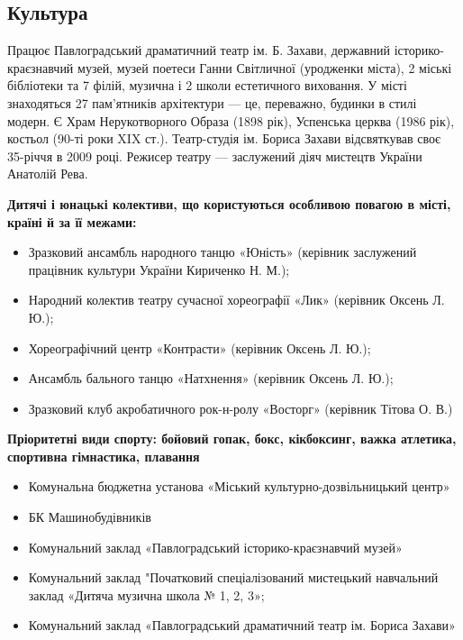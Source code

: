 \subsection{Культура}

 Працює Павлоградський драматичний театр ім. Б. Захави, державний історико-краєзнавчий музей, музей поетеси Ганни Світличної (уродженки міста), 2 міські бібліотеки та 7 філій, музична і 2 школи естетичного виховання. У місті знаходяться 27 пам'ятників архітектури — це, переважно, будинки в стилі модерн. Є Храм Нерукотворного Образа (1898 рік), Успенська церква (1986 рік), костьол (90-ті роки XIX ст.). Театр-студія ім. Бориса Захави відсвяткував своє 35-річчя в 2009 році. Режисер театру — заслужений діяч мистецтв України Анатолій Рева.


\textbf{Дитячі і юнацькі колективи, що користуються особливою повагою в місті, країні й за її межами:}
\begin{itemize}
	\item Зразковий ансамбль народного танцю «Юність» (керівник заслужений працівник культури України Кириченко Н. М.);
	\item Народний колектив театру сучасної хореографії «Лик» (керівник Оксень Л. Ю.);
	\item Хореографічний центр «Контрасти» (керівник Оксень Л. Ю.);
	\item Ансамбль бального танцю «Натхнення» (керівник Оксень Л. Ю.);
	\item Зразковий клуб акробатичного рок-н-ролу «Восторг» (керівник Тітова О. В.)
\end{itemize}
	
\textbf{Пріоритетні види спорту: бойовий гопак, бокс, кікбоксинг, важка атлетика, спортивна гімнастика, плавання}
\begin{itemize}
	\item Комунальна бюджетна установа «Міський культурно-дозвільницький центр»
	\item БК Машинобудівників
	\item Комунальний заклад «Павлоградський історико-краєзнавчий музей»
	\item Комунальний заклад "Початковий спеціалізований мистецький навчальний заклад «Дитяча музична школа № 1, 2, 3»;
	\item Комунальний заклад «Павлоградський драматичний театр ім. Бориса Захави»
\end{itemize}

